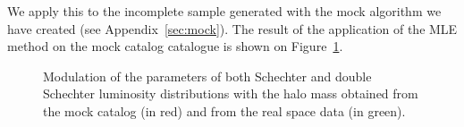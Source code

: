 We apply this to the incomplete sample generated with the mock algorithm we
have created (see Appendix~\ref{sec:mock}). The result of the application of
the MLE method on the mock catalog catalogue is shown on
Figure~\ref{fig:modulation}.
%
\begin{figure}
    \centering
    \begin{minipage}{\linewidth}
    \centering
    \end{minipage}
    \begin{minipage}{\linewidth}
    \centering
    \end{minipage}
    \caption{Modulation of the parameters of both Schechter and double
    Schechter luminosity distributions with the halo mass obtained from the
mock catalog (in red) and from the real space data (in
green).\label{fig:modulation}}
\end{figure}

